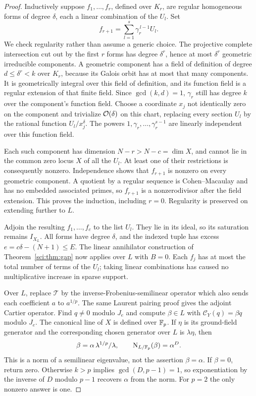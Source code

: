\begin{proof}
Inductively suppose \(f_1,\ldots,f_r\), defined over \(K_r\), are
regular homogeneous forms of degree \(\delta\), each a linear
combination of the \(U_l\). Set
\[
 f_{r+1}=\sum_{l=1}^s\gamma_r^{\,l-1}U_l.
 \]
We check regularity rather than assume a generic choice.
The projective complete intersection cut out by the first \(r\)
forms has degree \(\delta^r\), hence at most \(\delta^r\)
geometric irreducible components. A geometric component has a field
of definition of degree \(d\leq\delta^r<k\) over \(K_r\), because
its Galois orbit has at most that many components. It is geometrically
integral over this field of definition, and its function field is a
regular extension of that finite field. Since \(\gcd(k,d)=1\),
\(\gamma_r\) still has degree \(k\) over the component's function
field. Choose a coordinate \(x_j\) not identically zero on the component
and trivialize \(\mathcal O(\delta)\) on this chart, replacing every section
\(U_l\) by the rational function \(U_l/x_j^\delta\).
The powers \(1,\gamma_r,\ldots,\gamma_r^{s-1}\) are linearly independent
over this function field.

Each such component has dimension \(N-r>N-c=\dim X\), and cannot
lie in the common zero locus \(X\) of all the \(U_l\). At least one
of their restrictions is consequently nonzero. Independence shows
that \(f_{r+1}\) is nonzero on every geometric component. A quotient
by a regular sequence is Cohen--Macaulay and has no embedded
associated primes, so \(f_{r+1}\) is a nonzerodivisor after the field
extension. This proves the induction, including \(r=0\).
Regularity is preserved on extending further to \(L\).

Adjoin the resulting \(f_1,\ldots,f_c\) to the list \(U_l\).
They lie in its ideal, so its saturation remains \(I_{X_L}\).
All forms have degree \(\delta\), and the indexed tuple has excess
\(e=c\delta-(N+1)\leq E\). The linear annihilator construction of
Theorem~\ref{sci:thm:gap} now applies over \(L\) with \(B=0\).
Each \(f_j\) has at most the total number of terms of the \(U_l\);
taking linear combinations has caused no multiplicative increase
in sparse support.

Over \(L\), replace \(\mathcal T\) by the inverse-Frobenius-semilinear
operator which also sends each coefficient \(a\) to \(a^{1/p}\).
The same Laurent pairing proof gives the adjoint Cartier operator.
Find \(q\ne0\) modulo \(J_e\) and compute \(\beta\in L\) with
\(\mathcal C_Y(q)=\beta q\) modulo \(J_e\). The canonical line of
\(X\) is defined over \(\mathbb F_p\). If \(\eta\) is its ground-field
generator and the corresponding chosen generator over \(L\) is
\(\lambda\eta\), then
\[
 \beta=\alpha\,\lambda^{1/p}/\lambda,\qquad
 \operatorname{N}_{L/\mathbb F_p}(\beta)=\alpha^D.
 \]
This is a norm of a semilinear eigenvalue, not the assertion
\(\beta=\alpha\).
If \(\beta=0\), return zero. Otherwise \(k>p\) implies
\(\gcd(D,p-1)=1\), so exponentiation by the inverse of \(D\)
modulo \(p-1\) recovers \(\alpha\) from the norm. For \(p=2\)
the only nonzero answer is one.


\end{proof}
